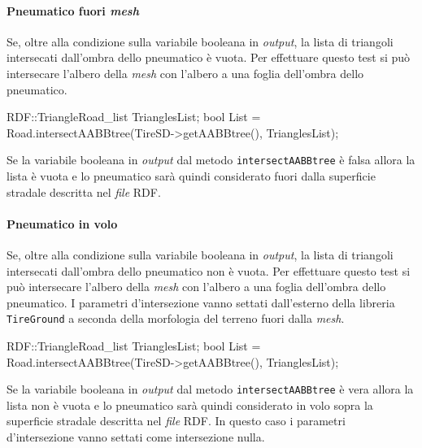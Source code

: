 \paragraph{Pneumatico fuori \textit{mesh}} Se, oltre alla condizione sulla variabile booleana in \textit{output}, la lista di triangoli intersecati dall'ombra dello pneumatico è vuota. Per effettuare questo test si può intersecare l'albero della \textit{mesh} con l'albero a una foglia dell'ombra dello pneumatico.
\begin{pseudoc}
	RDF::TriangleRoad_list TrianglesList;
	bool List = Road.intersectAABBtree(TireSD->getAABBtree(), TrianglesList);
\end{pseudoc}
Se la variabile booleana in \textit{output} dal metodo \texttt{intersectAABBtree} è falsa allora la lista è vuota e lo pneumatico sarà quindi considerato fuori dalla superficie stradale descritta nel \textit{file} \ac{RDF}.
%
\paragraph{Pneumatico in volo}
Se, oltre alla condizione sulla variabile booleana in \textit{output}, la lista di triangoli intersecati dall'ombra dello pneumatico non è vuota. Per effettuare questo test si può intersecare l'albero della \textit{mesh} con l'albero a una foglia dell'ombra dello pneumatico. I parametri d'intersezione vanno settati dall'esterno della libreria \texttt{TireGround} a seconda della morfologia del terreno fuori dalla \textit{mesh}.
\begin{pseudoc}
	RDF::TriangleRoad_list TrianglesList;
	bool List = Road.intersectAABBtree(TireSD->getAABBtree(), TrianglesList);
\end{pseudoc}
Se la variabile booleana in \textit{output} dal metodo \texttt{intersectAABBtree} è vera allora la lista non è vuota e lo pneumatico sarà quindi considerato in volo sopra la superficie stradale descritta nel \textit{file} \ac{RDF}. In questo caso i parametri d'intersezione vanno settati come intersezione nulla.
%
%
